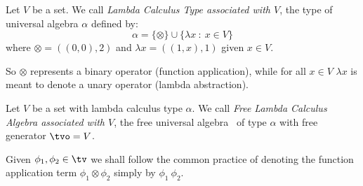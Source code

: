 \begin{defin}\label{logic:def:LAM:type}
Let $V$ be a set. We call {\em Lambda Calculus Type associated
with $V$}, the type of universal algebra $\alpha$ defined by:
    \[
    \alpha=\{\otimes\}\cup\{\lambda x\ :\ x\in V\}
    \]
where $\otimes=((0,0),2)$ and $\lambda x=((1,x),1)$ given $x\in V$.
\end{defin}

So $\otimes$ represents a binary operator (function application),
while for all $x\in V$ $\lambda x$ is meant to denote a unary operator 
(lambda abstraction).


\begin{defin}\label{logic:def:LAM:free:algebra}
Let $V$ be a set with lambda calculus type $\alpha$. We call {\em
Free Lambda Calculus Algebra associated with $V$},
the free universal algebra \tv\ of type $\alpha$ with free generator
$\tvo=V$.
\end{defin}

Given $\phi_{1}, \phi_{2}\in\tv$ we shall follow the common practice of 
denoting the function application term $\phi_{1}\otimes \phi_{2}$ 
simply by $\phi_{1}\ \phi_{2}$.


